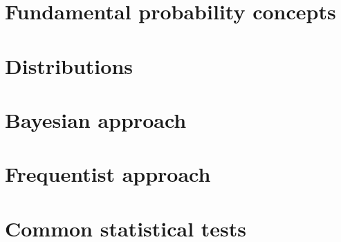 \section{Fundamental probability concepts}


\section{Distributions}


\section{Bayesian approach}


\section{Frequentist approach}


\section{Common statistical tests}

